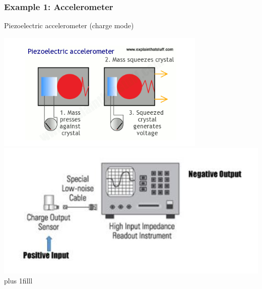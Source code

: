 \documentclass[fleqn]{beamer} %
\newcommand{\sectionIIsubsectionIIItitle}{Example 1: Accelerometer}
\newcommand{\btVFill}{\vskip0pt plus 1filll}
\begin{document}
			\begin{frame}
			\frametitle{\sectionIIsubsectionIIItitle}

				Piezoelectric accelerometer (charge mode)                               
 
			 	\includegraphics[scale=.55]{images/Piezoelectric.png}
			 	\includegraphics[scale=.35]{images/charge_accel_wiring.png}
			    \btVFill

			\end{frame}
\end{document}
